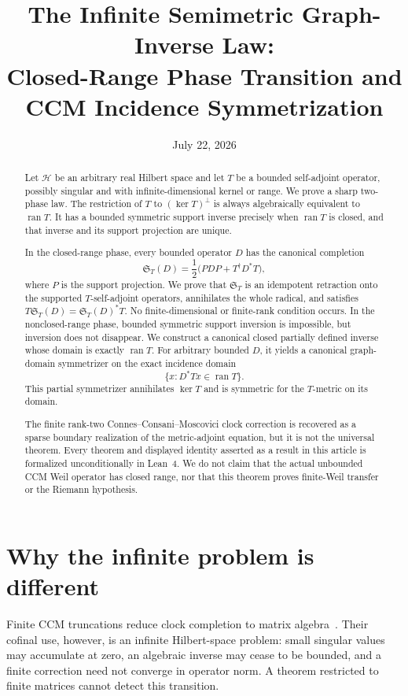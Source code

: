 \documentclass[11pt]{article}
\title{The Infinite Semimetric Graph-Inverse Law:\\
Closed-Range Phase Transition and CCM Incidence Symmetrization}
\author{}
\date{July 22, 2026}
\theoremstyle{definition}
\theoremstyle{remark}
\newcommand{\Hh}{\mathcal H}
\newcommand{\ran}{\operatorname{ran}}
\newcommand{\kerop}{\operatorname{ker}}
\begin{document}
\maketitle

\begin{abstract}
Let $\Hh$ be an arbitrary real Hilbert space and let $T$ be a bounded self-adjoint operator,
possibly singular and with infinite-dimensional kernel or range.  We prove a sharp two-phase law.
The restriction of $T$ to $(\kerop T)^\perp$ is always algebraically equivalent to $\ran T$.
It has a bounded symmetric support inverse precisely when $\ran T$ is closed, and that inverse and
its support projection are unique.

In the closed-range phase, every bounded operator $D$ has the canonical completion
\[
 \mathfrak S_T(D)=\frac12\bigl(PDP+T^\dagger D^*T\bigr),
\]
where $P$ is the support projection.  We prove that $\mathfrak S_T$ is an idempotent retraction
onto the supported $T$-self-adjoint operators, annihilates the whole radical, and satisfies
$T\mathfrak S_T(D)=\mathfrak S_T(D)^*T$.  No finite-dimensional or finite-rank condition occurs.
In the nonclosed-range phase, bounded symmetric support inversion is impossible, but inversion
does not disappear.  We construct a canonical closed partially defined inverse whose domain is
exactly $\ran T$.  For arbitrary bounded $D$, it yields a canonical graph-domain symmetrizer on
the exact incidence domain
\[
 \{x:D^*Tx\in\ran T\}.
\]
This partial symmetrizer annihilates $\kerop T$ and is symmetric for the $T$-metric on its domain.

The finite rank-two Connes--Consani--Moscovici clock correction is recovered as a sparse boundary
realization of the metric-adjoint equation, but it is not the universal theorem.  Every theorem
and displayed identity asserted as a result in this article is formalized unconditionally in
Lean~4.  We do not claim
that the actual unbounded CCM Weil operator has closed range, nor that this theorem proves
finite-Weil transfer or the Riemann hypothesis.
\end{abstract}

\section{Why the infinite problem is different}

Finite CCM truncations reduce clock completion to matrix algebra~\cite{CCM2025,CvS2025}.  Their
cofinal use, however, is an infinite Hilbert-space problem: small singular values may accumulate at
zero, an algebraic inverse may cease to be bounded, and a finite correction need not converge in
operator norm.  A theorem restricted to finite matrices cannot detect this transition.
\end{document}
